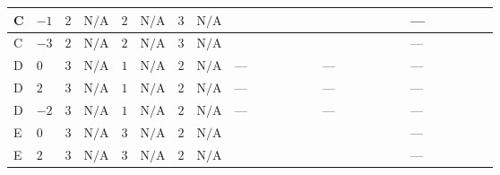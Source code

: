 \documentclass[8pt]{article}
\begin{document}
\begin{landscape}
\begin{longtable}{@{}llcccccc >{\raggedright\arraybackslash}p{0.21\linewidth} >{\raggedright\arraybackslash}p{0.21\linewidth} >{\raggedright\arraybackslash}p{0.21\linewidth}@{}}
\midrule
C & $-1$ & $2$ & $\text{N/A}$ & $2$ & $\text{N/A}$ & $3$ & $\text{N/A}$ & \scriptsize\adjustbox{max width=\linewidth}{$\begin{gathered} +8 {\lambda_{HS_2}^{(1)}} {\lambda_{HS_2}^{(A)}}\end{gathered}$} & \scriptsize\adjustbox{max width=\linewidth}{$\begin{gathered} +2 {\lambda_{HS_2}^{(A)}} {\lambda_{S_2}^{(1)}}\end{gathered}$} & --- \\
\midrule
C & $-3$ & $2$ & $\text{N/A}$ & $2$ & $\text{N/A}$ & $3$ & $\text{N/A}$ & \scriptsize\adjustbox{max width=\linewidth}{$\begin{gathered} +8 {\lambda_{HS_2}^{(1)}} {\lambda_{HS_2}^{(A)}}\end{gathered}$} & \scriptsize\adjustbox{max width=\linewidth}{$\begin{gathered} +2 {\lambda_{HS_2}^{(A)}} {\lambda_{S_2}^{(1)}}\end{gathered}$} & --- \\
\midrule
D & $0$ & $3$ & $\text{N/A}$ & $1$ & $\text{N/A}$ & $2$ & $\text{N/A}$ & --- & --- & --- \\
\midrule
D & $2$ & $3$ & $\text{N/A}$ & $1$ & $\text{N/A}$ & $2$ & $\text{N/A}$ & --- & --- & --- \\
\midrule
D & $-2$ & $3$ & $\text{N/A}$ & $1$ & $\text{N/A}$ & $2$ & $\text{N/A}$ & --- & --- & --- \\
\midrule
E & $0$ & $3$ & $\text{N/A}$ & $3$ & $\text{N/A}$ & $2$ & $\text{N/A}$ & \scriptsize\adjustbox{max width=\linewidth}{$\begin{gathered} +8 {\lambda_{HS_2}^{(1)}} {\lambda_{HS_2}^{(A)}}\end{gathered}$} & \scriptsize\adjustbox{max width=\linewidth}{$\begin{gathered} +2 {\lambda_{HS_2}^{(A)}} {\lambda_{S_2}^{(1)}}\end{gathered}$} & --- \\
\midrule
E & $2$ & $3$ & $\text{N/A}$ & $3$ & $\text{N/A}$ & $2$ & $\text{N/A}$ & \scriptsize\adjustbox{max width=\linewidth}{$\begin{gathered} +8 {\lambda_{HS_2}^{(1)}} {\lambda_{HS_2}^{(A)}}\end{gathered}$} & \scriptsize\adjustbox{max width=\linewidth}{$\begin{gathered} +2 {\lambda_{HS_2}^{(A)}} {\lambda_{S_2}^{(1)}}\end{gathered}$} & --- \\

\end{longtable}
\end{landscape}
\end{document}
